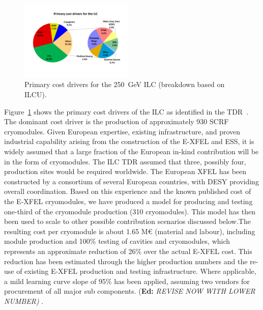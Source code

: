 \documentclass[%
 reprint,
 floatfix,
 amsmath,amssymb,
 aps,
]{revtex4-1}
\newif\ifEdNotes \EdNotestrue
\newcommand{\doednote}[1]{{\color{red}(\textbf{Ed:} \textit{#1)}}}
\newcommand{\ednote}[1]{\ifEdNotes 
  \doednote{#1} 
\fi}
\begin{document}
\begin{figure}[htbp]
\begin{center}
\includegraphics[width=0.48\textwidth]{figures/eap-chp3-ilccostdrivers.pdf}
 \caption{\label{fig:constructionmodel:ILCPrimaryCostDrivers} Primary cost drivers for the 250~GeV ILC (breakdown based on ILCU).}
\end{center}
\end{figure}

Figure~\ref{fig:constructionmodel:ILCPrimaryCostDrivers} shows the primary cost drivers of the ILC as identified in the
TDR~\cite{Adolphsen:2013kya}. The dominant cost driver is the production of approximately 930 SCRF cryomodules. Given European expertise, 
existing infrastructure, and proven industrial capability arising from the construction 
of the E-XFEL and ESS, it is widely assumed that a large fraction of the European in-kind contribution 
will be in the form of cryomodules. The ILC TDR assumed that three, possibly four, production sites 
would be required worldwide. 
The European XFEL has been constructed by a consortium of several European 
countries, with DESY providing overall coordination. Based on this experience 
and the known published cost of the E-XFEL cryomodules, we have produced a model 
for producing and testing one-third of the cryomodule production (310 
cryomodules). This model has then been used to scale to other possible 
contribution scenarios discussed below.The resulting cost per cryomodule is 
about 1.65 M\euro{} (material and labour), including module production and 100\% 
testing of cavities and cryomodules, which represents an approximate reduction 
of 26\% over the actual E-XFEL cost. This reduction has been estimated through 
the higher production numbers and the re-use of existing E-XFEL production and 
testing infrastructure.  Where applicable, a mild learning curve slope of 95\% 
has been applied, assuming two vendors for procurement of all major sub 
components. \ednote{REVISE NOW WITH LOWER NUMBER}.
\end{document}
